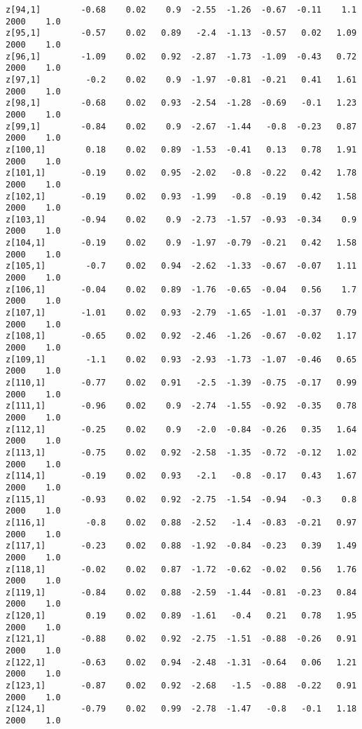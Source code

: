 \documentclass[11pt]{article}
\begin{document}
\begin{Verbatim}[commandchars=\\\{\}]
z[94,1]        -0.68    0.02    0.9  -2.55  -1.26  -0.67  -0.11    1.1   2000    1.0
z[95,1]        -0.57    0.02   0.89   -2.4  -1.13  -0.57   0.02   1.09   2000    1.0
z[96,1]        -1.09    0.02   0.92  -2.87  -1.73  -1.09  -0.43   0.72   2000    1.0
z[97,1]         -0.2    0.02    0.9  -1.97  -0.81  -0.21   0.41   1.61   2000    1.0
z[98,1]        -0.68    0.02   0.93  -2.54  -1.28  -0.69   -0.1   1.23   2000    1.0
z[99,1]        -0.84    0.02    0.9  -2.67  -1.44   -0.8  -0.23   0.87   2000    1.0
z[100,1]        0.18    0.02   0.89  -1.53  -0.41   0.13   0.78   1.91   2000    1.0
z[101,1]       -0.19    0.02   0.95  -2.02   -0.8  -0.22   0.42   1.78   2000    1.0
z[102,1]       -0.19    0.02   0.93  -1.99   -0.8  -0.19   0.42   1.58   2000    1.0
z[103,1]       -0.94    0.02    0.9  -2.73  -1.57  -0.93  -0.34    0.9   2000    1.0
z[104,1]       -0.19    0.02    0.9  -1.97  -0.79  -0.21   0.42   1.58   2000    1.0
z[105,1]        -0.7    0.02   0.94  -2.62  -1.33  -0.67  -0.07   1.11   2000    1.0
z[106,1]       -0.04    0.02   0.89  -1.76  -0.65  -0.04   0.56    1.7   2000    1.0
z[107,1]       -1.01    0.02   0.93  -2.79  -1.65  -1.01  -0.37   0.79   2000    1.0
z[108,1]       -0.65    0.02   0.92  -2.46  -1.26  -0.67  -0.02   1.17   2000    1.0
z[109,1]        -1.1    0.02   0.93  -2.93  -1.73  -1.07  -0.46   0.65   2000    1.0
z[110,1]       -0.77    0.02   0.91   -2.5  -1.39  -0.75  -0.17   0.99   2000    1.0
z[111,1]       -0.96    0.02    0.9  -2.74  -1.55  -0.92  -0.35   0.78   2000    1.0
z[112,1]       -0.25    0.02    0.9   -2.0  -0.84  -0.26   0.35   1.64   2000    1.0
z[113,1]       -0.75    0.02   0.92  -2.58  -1.35  -0.72  -0.12   1.02   2000    1.0
z[114,1]       -0.19    0.02   0.93   -2.1   -0.8  -0.17   0.43   1.67   2000    1.0
z[115,1]       -0.93    0.02   0.92  -2.75  -1.54  -0.94   -0.3    0.8   2000    1.0
z[116,1]        -0.8    0.02   0.88  -2.52   -1.4  -0.83  -0.21   0.97   2000    1.0
z[117,1]       -0.23    0.02   0.88  -1.92  -0.84  -0.23   0.39   1.49   2000    1.0
z[118,1]       -0.02    0.02   0.87  -1.72  -0.62  -0.02   0.56   1.76   2000    1.0
z[119,1]       -0.84    0.02   0.88  -2.59  -1.44  -0.81  -0.23   0.84   2000    1.0
z[120,1]        0.19    0.02   0.89  -1.61   -0.4   0.21   0.78   1.95   2000    1.0
z[121,1]       -0.88    0.02   0.92  -2.75  -1.51  -0.88  -0.26   0.91   2000    1.0
z[122,1]       -0.63    0.02   0.94  -2.48  -1.31  -0.64   0.06   1.21   2000    1.0
z[123,1]       -0.87    0.02   0.92  -2.68   -1.5  -0.88  -0.22   0.91   2000    1.0
z[124,1]       -0.79    0.02   0.99  -2.78  -1.47   -0.8   -0.1   1.18   2000    1.0

\end{Verbatim}
\end{document}
